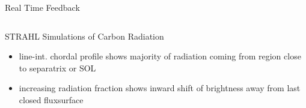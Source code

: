 \documentclass[final]{beamer}
\begin{document}
\begin{frame}
\begin{minipage}[t]{0.6\textwidth}
\begin{kasten}{Real Time Feedback}
\begin{columns}
\begin{kasten4}{%
                        STRAHL Simulations of Carbon Radiation}
                        \small{\begin{itemize}%
                            \item{%
                                line-int. chordal profile shows %
                                majority of radiation coming from region close %
                                to separatrix or SOL}%
                            \item{%
                                increasing radiation fraction shows inward %
                                shift of brightness away from last closed %
                                fluxsurface}%
                        \end{itemize}}%
                        \vspace*{.25cm}%
                        \centering{\color{red}{%
                            What causes this behaviour given %
                            the 1D radiation distribution %
                            and plasma profiles?}}%
                        \vspace*{.25cm}%


\end{kasten4}
\end{columns}
\end{kasten}
\end{minipage}
\end{frame}
\end{document}
